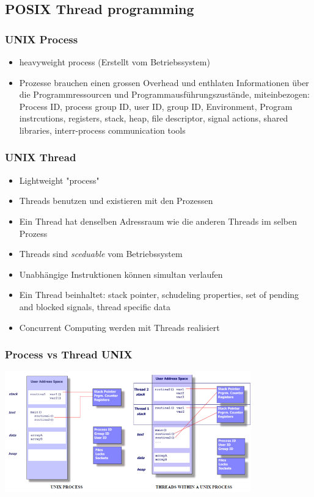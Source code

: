 \newpage

\subsection{POSIX Thread programming}
\begin{multicols}{2}
\subsubsection{UNIX Process}
\begin{itemize}
  \item heavyweight process (Erstellt vom Betriebssystem)
  \item Prozesse brauchen einen grossen Overhead und enthlaten Informationen über die Programmressourcen und Programmausführungszustände, miteinbezogen:
  Process ID, process group ID, user ID, group ID, Environment, Program instrcutions, registers, stack, heap, file descriptor, signal actions, shared libraries, interr-process communication tools
\end{itemize}
\vfill\null
\columnbreak
\subsubsection{UNIX Thread}
\begin{itemize}
  \item Lightweight "process"
  \item Threads benutzen und existieren mit den Prozessen
  \item Ein Thread hat denselben Adressraum wie die anderen Threads im selben Prozess
  \item Threads sind \textit{sceduable} vom Betriebssystem
  \item Unabhängige Instruktionen können simultan verlaufen
  \item Ein Thread beinhaltet: stack pointer, schudeling properties, set of pending and blocked signals, thread specific data
  \item Concurrent Computing werden mit Threads realisiert
\end{itemize}
\end{multicols}

\subsubsection{Process vs Thread UNIX}
\begin{center}
  \includegraphics[width=0.8\textwidth]{images/Concurrency/ProcessVsThread.png}
\end{center}

